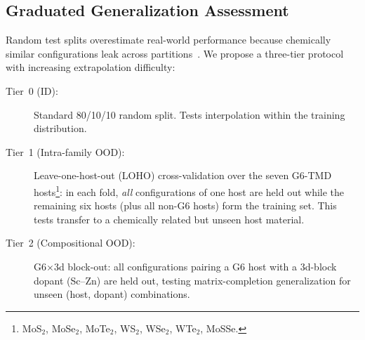 \subsection{Graduated Generalization Assessment}\label{sec:ood_method}

Random test splits overestimate real-world performance because chemically
similar configurations leak across partitions~\cite{li2025ood,omee2024}.
We propose a three-tier protocol with increasing extrapolation difficulty:

\begin{description}
  \item[Tier~0 (ID):]
    Standard 80/10/10 random split.
    Tests interpolation within the training distribution.

  \item[Tier~1 (Intra-family OOD):]
    Leave-one-host-out (LOHO) cross-validation over the seven G6-TMD
    hosts\footnote{MoS$_2$, MoSe$_2$, MoTe$_2$, WS$_2$, WSe$_2$,
    WTe$_2$, MoSSe.}:
    in each fold, \emph{all} configurations of one host are held out while
    the remaining six hosts (plus all non-G6 hosts) form the training set.
    This tests transfer to a chemically related but unseen host material.

  \item[Tier~2 (Compositional OOD):]
    G6$\times$3d block-out: all configurations pairing a G6 host with a
    3d-block dopant (Sc--Zn) are held out, testing matrix-completion
    generalization for unseen (host, dopant) combinations.
\end{description}
